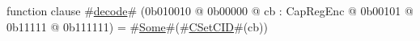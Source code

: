 function clause #\hyperref[zdecode]{decode}# (0b010010 @ 0b00000 @ cb : CapRegEnc @    0b00101 @    0b11111 @ 0b111111) = #\hyperref[zSome]{Some}#(#\hyperref[zCSetCID]{CSetCID}#(cb))

